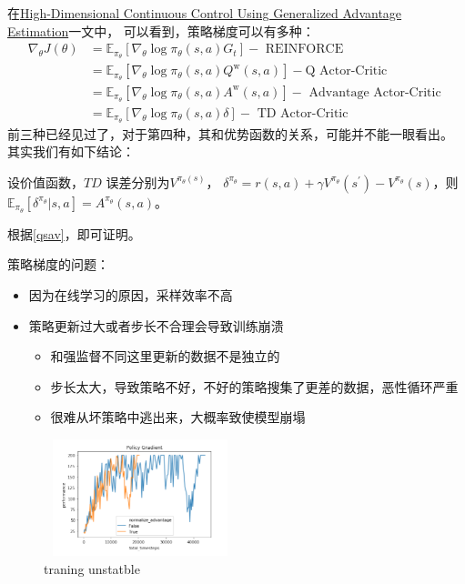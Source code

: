 \documentclass[UTF8]{ctexart}
\begin{document}
在\href{https://arxiv.org/abs/1506.02438}{High-Dimensional Continuous Control Using Generalized Advantage Estimation}一文中，
可以看到，策略梯度可以有多种：
\begin{equation}\begin{aligned}
    \nabla_{\theta} J(\theta) &=\mathbb{E}_{\pi_{\theta}}\left[\nabla_{\theta} \log \pi_{\theta}(s, a) G_{t}\right]-\text { REINFORCE } \\
    &=\mathbb{E}_{\pi_{\theta}}\left[\nabla_{\theta} \log \pi_{\theta}(s, a) Q^{\mathrm{w}}(s, a)\right]-\mathrm{Q} \text { Actor-Critic } \\
    &=\mathbb{E}_{\pi_{\theta}}\left[\nabla_{\theta} \log \pi_{\theta}(s, a) A^{\mathrm{w}}(s, a)\right]-\text { Advantage Actor-Critic } \\
    &=\mathbb{E}_{\pi_{\theta}}\left[\nabla_{\theta} \log \pi_{\theta}(s, a) \delta\right]-\text { TD Actor-Critic }
    \end{aligned}
\end{equation}
前三种已经见过了，对于第四种，其和优势函数的关系，可能并不能一眼看出。
其实我们有如下结论：
\begin{corollary}
    设价值函数，$TD$ 误差分别为$V^{\pi_{\theta}(s)}$， $\delta^{\pi_{\theta}}=r(s, a)+\gamma V^{\pi_{\theta}}\left(s^{\prime}\right)-V^{\pi_{\theta}}(s)$，则
    $\mathbb{E}_{\pi_{\theta}}[\delta^{\pi_{\theta}}|s,a] = A^{\pi_{\theta}}(s,a)$。
\end{corollary}
根据\eqref{qsav}，即可证明。

策略梯度的问题：
\begin{itemize}
    \item 因为在线学习的原因，采样效率不高
    \item 策略更新过大或者步长不合理会导致训练崩溃
    \begin{itemize}
        \item 和强监督不同这里更新的数据不是独立的
        \item 步长太大，导致策略不好，不好的策略搜集了更差的数据，恶性循环严重
        \item 很难从坏策略中逃出来，大概率致使模型崩塌
    \end{itemize}
\end{itemize}

\begin{figure}[htbp]
	\centering
	\includegraphics[width=5.6cm, height=3.4cm]{./pic/traning_stable.png}
    \caption{traning unstatble}
    \label{traning:unstatble}
\end{figure}
\end{document}
